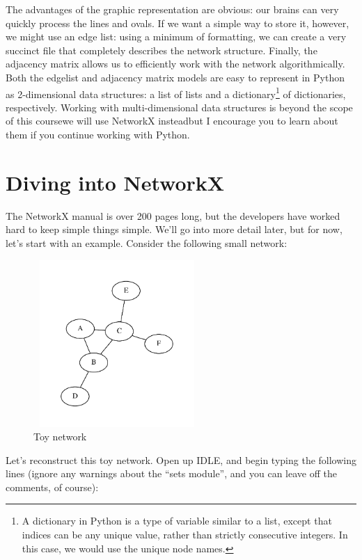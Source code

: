 \documentclass{article}
\begin{document}
\DefineShortVerb{\|}
The advantages of the graphic representation are obvious: our brains can very quickly process the lines and ovals.  
If we want a simple way to store it, however, we might use an edge list: using a minimum of formatting, we can create 
a very succinct file that completely describes the network structure.  Finally, the adjacency matrix allows us to efficiently 
work with the network algorithmically.  Both the edgelist and adjacency matrix models are easy to represent in Python as 2-dimensional 
data structures: a list of lists and a dictionary\footnote{A dictionary in Python is a type of variable similar to a list, except that 
indices can be any unique value, rather than strictly consecutive integers.  In this case, we would use the unique node names.} of 
dictionaries, respectively.  Working with multi-dimensional data structures is beyond the scope of this course\textemdash we will use NetworkX
instead\textemdash but I encourage you to learn about them if you continue working with Python.


\section{Diving into NetworkX}
\label{diving}
The NetworkX manual is over 200 pages long, but the developers have worked hard to keep simple things simple.  We'll go into more detail later,
but for now, let's start with an example.  Consider the following small network:

\begin{figure}[h]
\label{toy_net}
\begin{center}
\includegraphics[trim = .4in .4in .4in .4in, clip, width=2.5in, height=2.5in]{7_sampleA-F.pdf}
\caption{Toy network}
\end{center}
\end{figure}

Let's reconstruct this toy network.  Open up IDLE, and begin typing the following lines (ignore any warnings about the ``sets module'', and you can leave off the comments, of course):
\end{document}
